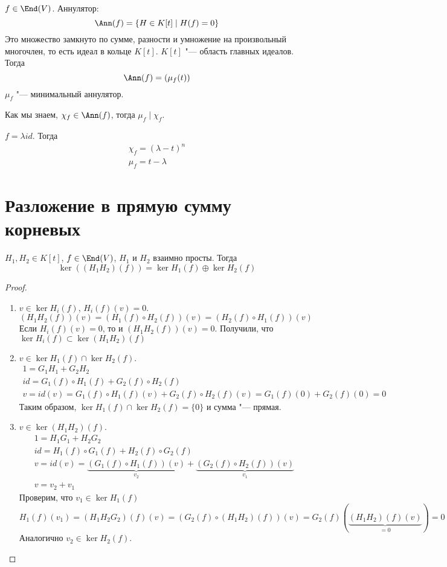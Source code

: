 \begin{Rem}
	$f \in \End(V)$.
	Аннулятор:
	\[ \Ann(f) = \{H \in K[t] \mid H(f) = 0\} \]
	Это множество замкнуто по сумме, разности и умножение на произвольный многочлен, то есть идеал в кольце $K[t]$.
	$K[t]$ "--- область главных идеалов.
	Тогда
	\[ \Ann(f) = \left( \mu_f(t) \right) \]
	$\mu_f$ "--- минимальный аннулятор.

	Как мы знаем, $\chi_f \in \Ann(f)$, тогда $\mu_f \mid \chi_f$.
\end{Rem}

\begin{exmp}
	$f = \lambda id$.
	Тогда
	\begin{gather*}
		\chi_f = (\lambda - t)^n \\
		\mu_f = t - \lambda
	\end{gather*}
\end{exmp}

\section{Разложение в прямую сумму корневых}

\begin{theorem}
	$H_1, H_2 \in K[t]$, $f \in \End(V)$, $H_1$ и $H_2$ взаимно просты.
	Тогда 
	\[  \ker ((H_1H_2)(f)) = \ker H_1(f) \oplus \ker H_2(f) \]
\end{theorem}
\begin{proof}
	\begin{enumerate}
	\item
		$v \in \ker H_i(f)$, $H_i(f)(v) = 0$.
		\[ (H_1H_2(f))(v) = (H_1(f) \circ H_2(f))(v) = (H_2(f) \circ H_1(f))(v) \]
		Если $H_i(f)(v) = 0$, то и $(H_1H_2(f))(v) = 0$.
		Получили, что $\ker H_i(f) \subset \ker (H_1H_2)(f)$

	\item
		$v \in \ker H_1(f) \cap \ker H_2(f)$.
		\begin{gather*}
			1 = G_1 H_1 + G_2 H_2 \\
			id = G_1(f) \circ H_1(f) + G_2(f) \circ H_2(f) \\
			v = id(v) = G_1(f) \circ H_1(f)(v) + G_2(f) \circ H_2(f)(v) = G_1(f)(0) + G_2(f)(0) = 0
		\end{gather*}
		Таким образом, $\ker H_1(f) \cap \ker H_2(f) = \{0\}$ и сумма "--- прямая.

	\item
		$v \in \ker(H_1H_2)(f)$.
		\begin{gather*}
			1 = H_1 G_1 + H_2 G_2 \\
			id = H_1(f) \circ G_1(f) + H_2(f) \circ G_2(f) \\
			v = id(v) = \underbrace{(G_1(f) \circ H_1(f))(v)}_{v_2} + \underbrace{(G_2(f) \circ H_2(f))(v)}_{v_1} \\
			v = v_2 + v_1
		\end{gather*}
		Проверим, что $v_1 \in \ker H_1(f)$
		\[ H_1(f)(v_1) = (H_1H_2G_2)(f)(v) = (G_2(f) \circ (H_1H_2)(f))(v) = G_2(f)(\underbrace{(H_1H_2)(f)(v)}_{=0}) = 0 \]
		Аналогично $v_2 \in \ker H_2(f)$.
	\end{enumerate}
\end{proof}

